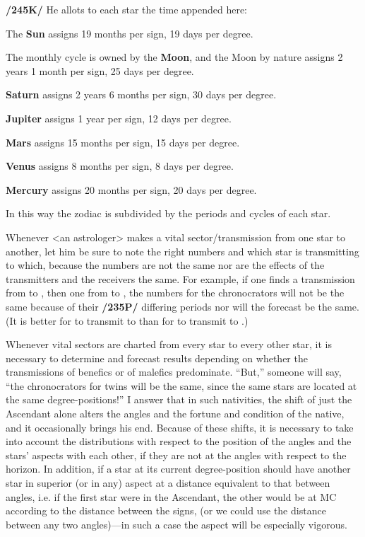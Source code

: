 \textbf{/245K/} He allots to each star the time appended here:

The \textbf{Sun} assigns 19 months per sign, 19 days per degree.

The monthly cycle is owned by the \textbf{Moon}, and the Moon by nature assigns 2 years 1 month per sign, 25 days per degree.

\textbf{Saturn} assigns 2 years 6 months per sign, 30 days per degree.

\textbf{Jupiter} assigns 1 year per sign, 12 days per degree.

\textbf{Mars} assigns 15 months per sign, 15 days per degree.

\textbf{Venus} assigns 8 months per sign, 8 days per degree.

\textbf{Mercury} assigns 20 months per sign, 20 days per degree.

In this way the zodiac is subdivided by the periods and cycles of each star. 

Whenever <an astrologer> makes a vital sector/transmission from one star to another, let him be sure to note the right numbers and which star is transmitting to which, because the numbers are not the same nor are the effects of the transmitters and the receivers the same. For example, if one finds a transmission from \Jupiter\xspace to \Mars, then one from \Mars\xspace to \Jupiter, the numbers for the chronocrators will not be the same because of their \textbf{/235P/} differing periods nor will the forecast be the same. (It is better for \Mars\xspace to transmit to \Jupiter than for \Jupiter\xspace to transmit to \Mars.) 

Whenever vital sectors are charted from every star to every other star, it is necessary to determine and forecast results depending on whether the transmissions of benefics or of malefics predominate.
“But,” someone will say, “the chronocrators for twins will be the same, since the same stars are located at the same degree-positions!” I answer that in such nativities, the shift of just the Ascendant alone
alters the angles and the fortune and condition of the native, and it occasionally brings his end. Because of these shifts, it is necessary to take into account the distributions with respect to the position of the angles and the stars’ aspects with each other, if they are not at the angles with respect to the horizon. In addition, if a star at its current degree-position should have another star in superior (or in any) aspect at a distance equivalent to that between angles, i.e. if the first star were in the Ascendant, the other would be at MC according to the distance between the signs, (or we could use the distance between any two angles)—in such a case the aspect will be especially vigorous.


